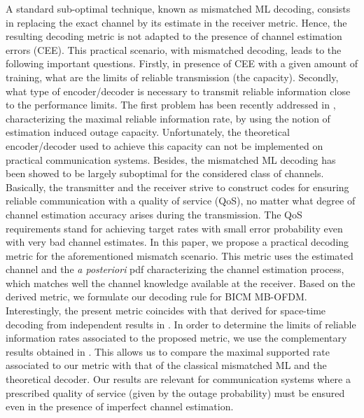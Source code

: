 \documentclass{article}
\begin{document}
A standard sub-optimal technique, known as mismatched ML decoding, consists in replacing the exact channel by its estimate in the receiver metric. Hence, the resulting decoding metric is not adapted to the presence of channel estimation errors (CEE). This practical scenario, with mismatched decoding, leads to the following important questions. Firstly, in presence of CEE with a given amount of training, what are the limits of reliable transmission (the capacity). Secondly, what type of encoder/decoder is necessary to transmit reliable information close to the performance limits. The first problem has been recently addressed in \cite{piantanida}, characterizing the maximal reliable information rate, by using the notion of estimation induced outage capacity. Unfortunately, the theoretical encoder/decoder used to achieve this capacity can not be implemented on practical communication systems. Besides, the mismatched ML decoding has been showed to be largely suboptimal for the considered class of channels. 
Basically, the transmitter and the receiver strive to construct codes for ensuring reliable communication with a quality of service (QoS), no matter what degree of channel estimation accuracy arises during the transmission. The QoS requirements stand for achieving target rates with small error probability even with very bad channel estimates. 
In this paper, we propose a practical decoding metric for the aforementioned mismatch scenario. This metric uses the estimated channel and the {\it a posteriori} pdf characterizing the channel estimation process, which matches well the channel knowledge available at the receiver. Based on the derived metric, we formulate our decoding rule for BICM MB-OFDM. Interestingly, the present metric coincides with that derived for space-time decoding from independent results in \cite{Biglieri_jour}. In order to determine the limits of reliable information rates associated to the proposed metric, we use the complementary results obtained in \cite{merhav94}. This allows us to compare the maximal supported rate associated to our metric with that of the classical mismatched ML and the theoretical decoder. Our results are relevant for communication systems where a prescribed quality of service (given by the outage probability) must be ensured even in the presence of imperfect channel estimation. 
  
\end{document}
